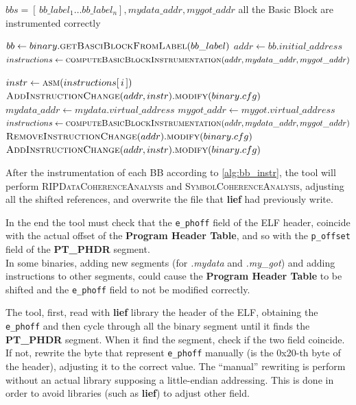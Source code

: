 \begin{algorithm}[ht]
    \caption{Instrument Basic Block algorithm}
    \label{alg:bb_instr}
    \begin{algorithmic}[1]
        \REQUIRE $bbs=[\, bb\_label_1 \dots bb\_label_n] , mydata\_addr , mygot\_addr$ 
        \ENSURE all the Basic Block are instrumented correctly

            \STATE $bb \gets binary.\textsc{getBasciBlockFromLabel}(bb\_label)$ \COMMENT{\small \textcolor{green!60!black}{``binary'' if the main object used by GRAPE and is a virtual representation of the ELF it is rewriting}}
            \STATE $addr \gets bb.initial\_address$
            \STATE $instructions \gets \textsc{computeBasicBlockInstrumentation}(addr,mydata\_addr,mygot\_addr)$ 

                    \STATE $instr \gets \textsc{asm}(instructions[\,i\,])$ 
                    \STATE $\textsc{AddInstructionChange}(addr,instr).\textsc{modify}(binary.cfg)$
                        \STATE $mydata\_addr \gets mydata.virtual\_address$
                        \STATE $mygot\_addr \gets mygot.virtual\_address$
                        \STATE $instructions \gets \textsc{computeBasicBlockInstrumentation}(addr,mydata\_addr,mygot\_addr)$ 
                        \STATE $\textsc{RemoveInstructionChange}(addr).\textsc{modify}(binary.cfg)$ 
                        \STATE $\textsc{AddInstructionChange}(addr,instr).\textsc{modify}(binary.cfg)$
                    \ENDIF
            \ENDFOR
        \ENDFOR
    \end{algorithmic}
\end{algorithm}

After the instrumentation of each \gls{BB} according to \cref{alg:bb_instr}, the tool will perform 
\textsc{RIPDataCoherenceAnalysis} and \textsc{SymbolCoherenceAnalysis}, adjusting all the shifted references, 
and overwrite the file that \textbf{lief} had previously write.

In the end the tool must check that the \texttt{e\_phoff} field of the \gls{ELF} header, coincide with 
the actual offset of the \textbf{Program Header Table}, and so with the \texttt{p\_offset} field of the 
\textbf{PT\_PHDR} segment.\\
In some binaries, adding new segments (for \textit{.mydata} and \textit{.my\_got}) and adding instructions to other segments, 
could cause the \textbf{Program Header Table} to be shifted and the \texttt{e\_phoff} field to not be modified correctly.

The tool, first, read with \textbf{lief} library the header of the \gls{ELF}, obtaining the \texttt{e\_phoff} and then 
cycle through all the binary segment until it finds the \textbf{PT\_PHDR} segment. When it find the segment, check 
if the two field coincide.
If not, rewrite the byte that represent \texttt{e\_phoff} manually (is the 0x20-th byte of the header), adjusting 
it to the correct value.
The ``manual'' rewriting is perform without an actual library supposing a little-endian addressing.
This is done in order to avoid libraries (such as \textbf{lief}) to adjust other field.
